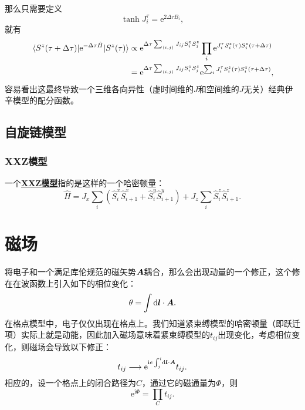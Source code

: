 \documentclass[hyperref, UTF8, a4paper]{ctexart}
\newcommand*{\ii}{\mathrm{i}}
\newcommand*{\ee}{\mathrm{e}}
\newcommand*{\pair}[1]{\langle #1 \rangle}
\newcommand*{\concept}[1]{\underline{\textbf{#1}}}
\begin{document}
那么只需要定义
\begin{equation}
    \tanh J^\tau_i = \ee^{2 \Delta \tau B_i}, 
\end{equation}
就有
\[
    \begin{aligned}
        \mel{S^z(\tau + \Delta \tau)}{\ee^{-\Delta \tau \hat{H}}}{S^z(\tau)} &\propto \ee^{\Delta \tau \sum_{\pair{i, j}} J_{ij} S_i^z S_j^z} \prod_i \ee^{J_i^\tau S_i^z(\tau) S_i^z(\tau + \Delta \tau)} \\
        &= \ee^{\Delta \tau \sum_{\pair{i, j}} J_{ij} S_i^z S_j^z} \ee^{\sum_i J_i^\tau S_i^z(\tau) S_i^z(\tau + \Delta \tau)},
    \end{aligned}
\]
容易看出这最终导致一个三维各向异性（虚时间维的$J$和空间维的$J$无关）经典伊辛模型的配分函数。

\subsection{自旋链模型}

\subsubsection{XXZ模型}

一个\concept{XXZ模型}指的是这样的一个哈密顿量：
\begin{equation}
    \hat{H} = J_x \sum_i (\hat{S}_{i}^x \hat{S}_{i+1}^x + \hat{S}_{i}^y \hat{S}_{i+1}^y) + J_z \sum_{i} \hat{S}_i^z \hat{S}_{i+1}^z.
\end{equation}

\section{磁场}

将电子和一个满足库伦规范的磁矢势$\vb*{A}$耦合，那么会出现动量的一个修正，这个修在在波函数上引入如下的相位变化：
\begin{equation}
    \theta = \int \dd{\vb*{l}} \cdot \vb*{A}.
\end{equation}
在格点模型中，电子仅仅出现在格点上。我们知道紧束缚模型的哈密顿量（即跃迁项）实际上就是动能，因此加入磁场意味着紧束缚模型的$t_{ij}$出现变化，考虑相位变化，则磁场会导致以下修正：
\begin{equation}
    t_{ij} \longrightarrow \ee^{\ii e \int_j^i \dd{\vb*{l}} \cdot \vb*{A} } t_{ij}.
\end{equation}
相应的，设一个格点上的闭合路径为$C$，通过它的磁通量为$\Phi$，则
\begin{equation}
    \ee^{\ii \Phi} = \prod_{C} t_{ij}.
\end{equation}
\end{document}
